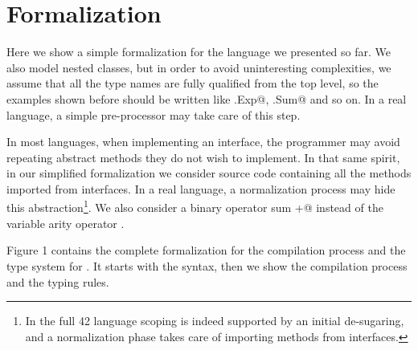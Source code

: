 \saveSpace\saveSpace\section{Formalization}\label{sec:formal}
\saveSpace\saveSpace

Here we show a simple formalization for the language we presented so far.
We also model nested classes, but in order to avoid uninteresting complexities, we assume that
all the type names are fully qualified from the top level, so the examples shown before should be
written like \Q@This.Exp@, \Q@This.Sum@ and so on.
In a real language, a simple pre-processor may take care of this step.

In most languages, when implementing an interface, the programmer may avoid repeating abstract methods
they do not wish to implement.
In that same spirit, in our simplified formalization we consider source code containing
all the methods imported from interfaces. In a real language, a normalization process
may hide this abstraction\footnote{
In the full 42 language scoping is indeed supported by an initial de-sugaring, and a normalization phase takes care of importing methods from interfaces.
}.
We also consider a binary operator sum \Q@+@ instead of the variable arity operator \Q@use@.

Figure 1 contains the complete formalization for the 
compilation process and the type system for \name.
It starts with the syntax, then
we show the compilation process and the typing rules.




